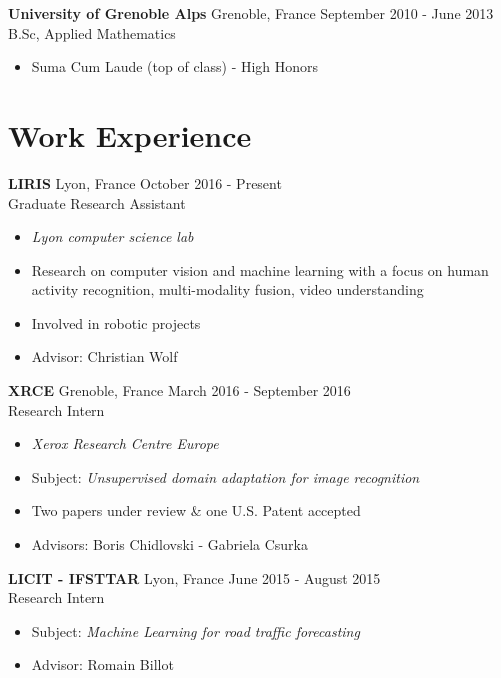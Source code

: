 \documentclass[10pt]{res} %
\begin{document}
\begin{resume}
\textbf{University of Grenoble Alps} \hfill Grenoble, France \hfill September 2010 - June 2013 \\
B.Sc, Applied Mathematics
\begin{itemize}
\item Suma Cum Laude (top of class) - High Honors
\end{itemize}
 

\section{\large Work Experience} 

\textbf{LIRIS} \hfill Lyon, France \hfill October 2016 - Present \\
Graduate Research Assistant
\begin{itemize}
\item \textit{Lyon computer science lab}
\item Research on computer vision and machine learning with a focus on human activity recognition, multi-modality fusion, video understanding
\item Involved in robotic projects
\item Advisor: Christian Wolf
\end{itemize}

\textbf{XRCE} \hfill Grenoble, France \hfill March 2016 - September 2016 \\
Research Intern
\begin{itemize}
\item \textit{Xerox Research Centre Europe}
\item Subject: \textit{Unsupervised domain adaptation for image recognition}
\item Two papers under review \& one U.S. Patent accepted
\item Advisors: Boris Chidlovski - Gabriela Csurka
\end{itemize}

\textbf{LICIT - IFSTTAR} \hfill Lyon, France \hfill June 2015 - August 2015 \\
Research Intern
\begin{itemize}
\item Subject: \textit{Machine Learning for road traffic forecasting}
\item Advisor: Romain Billot
\end{itemize}



\end{resume}
\end{document}
